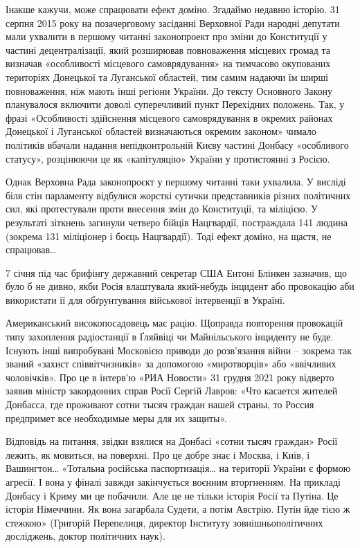 Інакше кажучи, може спрацювати ефект доміно. Згадаймо недавню історію. 31
серпня 2015 року на позачерговому засіданні Верховної Ради народні депутати
мали ухвалити в першому читанні законопроект про зміни до Конституції у частині
децентралізації, який розширював повноваження місцевих громад та визначав
«особливості місцевого самоврядування» на тимчасово окупованих територіях
Донецької та Луганської областей, тим самим надаючи їм ширші повноваження, ніж
мають інші регіони України. До тексту Основного Закону планувалося включити
доволі суперечливий пункт Перехідних положень. Так, у фразі «Особливості
здійснення місцевого самоврядування в окремих районах Донецької і Луганської
областей визначаються окремим законом» чимало політиків вбачали надання
непідконтрольній Києву частині Донбасу «особливого статусу», розцінюючи це як
«капітуляцію» України у протистоянні з Росією.

Однак Верховна Рада законопроєкт у першому читанні таки ухвалила. У висліді
біля стін парламенту відбулися жорсткі сутички представників різних політичних
сил, які протестували проти внесення змін до Конституції, та міліцією. У
результаті зіткнень загинули четверо бійців Нацгвардії, постраждала 141 людина
(зокрема 131 міліціонер і боєць Нацгвардії). Тоді ефект доміно, на щастя, не
спрацював…

7 січня під час брифінгу державний секретар США Ентоні Блінкен зазначив, що
було б не дивно, якби Росія влаштувала який-небудь інцидент або провокацію аби
використати її для обґрунтування військової інтервенції в Україні.

Американський високопосадовець має рацію. Щоправда повторення провокацій типу
захоплення радіостанції в Ґляйвіці чи Майнільського інциденту не буде. Існують
інші випробувані Московією приводи до розв’язання війни – зокрема так званий
«захист співвітчизників» за допомогою «миротворців» або «ввічливих чоловічків».
Про це в інтерв’ю «РИА Новости» 31 грудня 2021 року відверто заявив міністр
закордонних справ Росії Сергій Лавров: «Что касается жителей Донбасса, где
проживают сотни тысяч граждан нашей страны, то Россия предпримет все
необходимые меры для их защиты».


Відповідь на питання, звідки взялися на Донбасі «сотни тысяч граждан» Росії
лежить, як мовиться, на поверхні. Про це добре знає і Москва, і Київ, і
Вашингтон… «Тотальна російська паспортизація… на території України є формою
агресії. І вона у фіналі завжди закінчується воєнним вторгненням. На прикладі
Донбасу і Криму ми це побачили. Але це не тільки історія Росії та Путіна. Це
історія Німеччини. Як вона загарбала Судети, а потім Австрію. Путін йде тією ж
стежкою» (Григорій Перепелиця, директор Інституту зовнішньополітичних
досліджень, доктор політичних наук).

